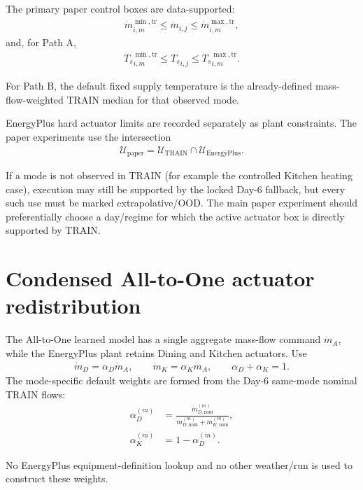 \documentclass[11pt]{article}
\newcommand{\Ts}{T_s}
\newcommand{\mdot}{\dot m}
\begin{document}
The primary paper control boxes are data-supported:
\begin{align}
\boxed{
\mdot_{i,m}^{\min,\mathrm{tr}}
\le
\mdot_{i,j}
\le
\mdot_{i,m}^{\max,\mathrm{tr}},
}
\tag{6.37}
\end{align}
and, for Path A,
\begin{align}
\boxed{
{\Ts}_{i,m}^{\min,\mathrm{tr}}
\le
{\Ts}_{i,j}
\le
{\Ts}_{i,m}^{\max,\mathrm{tr}}.
}
\tag{6.38}
\end{align}

For Path B, the default fixed supply temperature is the already-defined mass-flow-weighted
TRAIN median for that observed mode.

EnergyPlus hard actuator limits are recorded separately as plant constraints.  The paper
experiments use the intersection
\begin{align}
\boxed{
\mathcal U_{\mathrm{paper}}
=
\mathcal U_{\mathrm{TRAIN}}
\cap
\mathcal U_{\mathrm{EnergyPlus}}.
}
\tag{6.39}
\end{align}

If a mode is not observed in TRAIN (for example the controlled Kitchen heating case), execution
may still be supported by the locked Day-6 fallback, but every such use must be marked
extrapolative/OOD.  The main paper experiment should preferentially choose a day/regime for
which the active actuator box is directly supported by TRAIN.

\section{Condensed All-to-One actuator redistribution}

The All-to-One learned model has a single aggregate mass-flow command \(\mdot_A\), while the
EnergyPlus plant retains Dining and Kitchen actuators.  Use
\begin{align}
\boxed{
\mdot_D=\alpha_D\mdot_A,
\qquad
\mdot_K=\alpha_K\mdot_A,
\qquad
\alpha_D+\alpha_K=1.
}
\tag{6.40}
\end{align}
The mode-specific default weights are formed from the Day-6 same-mode nominal TRAIN flows:
\begin{align}
\alpha_D^{(m)}
&=
\frac{\mdot_{D,\mathrm{nom}}^{(m)}}
{\mdot_{D,\mathrm{nom}}^{(m)}+\mdot_{K,\mathrm{nom}}^{(m)}},
\\
\alpha_K^{(m)}
&=
1-\alpha_D^{(m)}.
\tag{6.41}
\end{align}

No EnergyPlus equipment-definition lookup and no other weather/run is used to construct these
weights.
\end{document}
